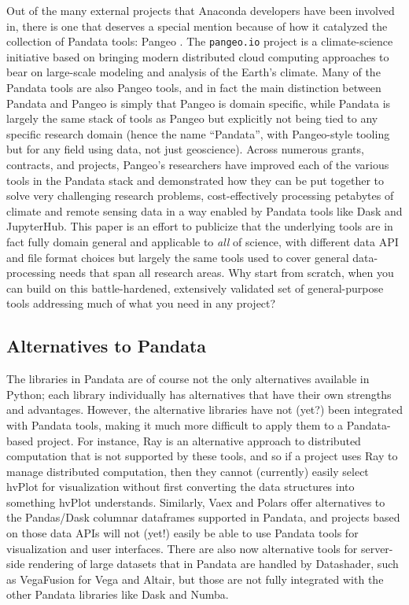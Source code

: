 Out of the many external projects that Anaconda developers have been involved in, there is one that deserves a special mention because of how it catalyzed the collection of Pandata tools: Pangeo \citep{odaka:tthpc20}. The \texttt{pangeo.io} project is a climate-science initiative based on bringing modern distributed cloud computing approaches to bear on large-scale modeling and analysis of the Earth's climate. Many of the Pandata tools are also Pangeo tools, and in fact the main distinction between Pandata and Pangeo is simply that Pangeo is domain specific, while Pandata is largely the same stack of tools as Pangeo but explicitly not being tied to any specific research domain (hence the name ``Pandata'', with Pangeo-style tooling but for any field using data, not just geoscience). Across numerous grants, contracts, and projects, Pangeo's researchers have improved each of the various tools in the Pandata stack and demonstrated how they can be put together to solve very challenging research problems, cost-effectively processing petabytes of climate and remote sensing data in a way enabled by Pandata tools like Dask and JupyterHub. This paper is an effort to publicize that the underlying tools are in fact fully domain general and applicable to \emph{all} of science, with different data API and file format choices but largely the same tools used to cover general data-processing needs that span all research areas. Why start from scratch, when you can build on this battle-hardened, extensively validated set of general-purpose tools addressing much of what you need in any project?

\subsection{Alternatives to Pandata}

The libraries in Pandata are of course not the only alternatives available in Python; each library individually has alternatives that have their own strengths and advantages. However, the alternative libraries have not (yet?) been integrated with Pandata tools, making it much more difficult to apply them to a Pandata-based project. For instance, Ray \citep{moritz:arxiv18} is an alternative approach to distributed computation that is not supported by these tools, and so if a project uses Ray to manage distributed computation, then they cannot (currently) easily select hvPlot for visualization without first converting the data structures into something hvPlot understands. Similarly, Vaex \citep{breddels:aaa18} and Polars \citep{ritche:polars} offer alternatives to the Pandas/Dask columnar dataframes supported in Pandata, and projects based on those data APIs will not (yet!) easily be able to use Pandata tools for visualization and user interfaces. There are also now alternative tools for server-side rendering of large datasets that in Pandata are handled by Datashader, such as VegaFusion for Vega and Altair, but those are not fully integrated with the other Pandata libraries like Dask and Numba.

